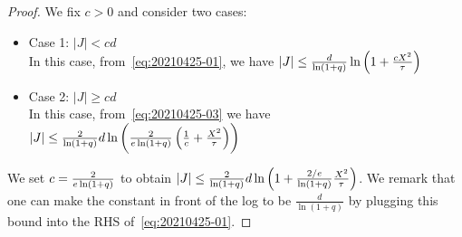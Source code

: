 \begin{proof}
  
  We fix $c>0$ and consider two cases:
  \begin{itemize}
    \item Case 1: $|J| < c d$ \\
    In this case, from~\eqref{eq:20210425-01}, we have $|J| \le \fr{d}{\ln(1+q)} \ln\del{1 + \fr{cX^2}{\tau} }  $ 
    \item Case 2: $|J| \ge cd$\\
    In this case, from~\eqref{eq:20210425-03} we have $ |J| \le  \fr{2}{\ln(1+q)} d \ln\del{\fr{2}{e \ln(1+q)}\del{\fr 1 {c}  + \fr {X^2} {\tau}}  }$
  \end{itemize}
  We set $c = { \frac{2}{e \ln(1+q)} }$ to obtain
  $   |J| \le \frac{2}{\ln(1+q)} d \ln \del{1 + \fr{2/e}{\ln(1+q)}\fr {X^2} {\tau}}  $.
  We remark that one can make the constant in front of the log to be $\frac{d}{\ln(1+q)}$ by plugging this bound into the RHS of~\eqref{eq:20210425-01}. 
\end{proof}

